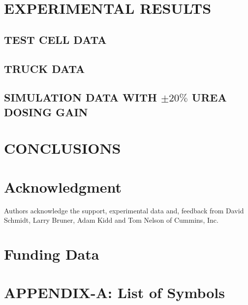 \documentclass[subscriptcorrection,upint,varvw,barcolor=Goldenrod3,mathalfa=cal=euler,balance,hyphenate,french,pdf-a]{asmejour}
\begin{document}
\section{EXPERIMENTAL RESULTS}
\subsection{TEST CELL DATA}
\subsection{TRUCK DATA}
\subsection{SIMULATION DATA WITH $\pm 20\%$ UREA DOSING GAIN}

\section{CONCLUSIONS}

\section*{Acknowledgment}
Authors acknowledge the support, experimental data and, feedback from David Schmidt, Larry
Bruner, Adam Kidd and Tom Nelson of Cummins, Inc.
\section*{Funding Data}

\appendix   %
\section{APPENDIX-A: List of Symbols}



\end{document}
